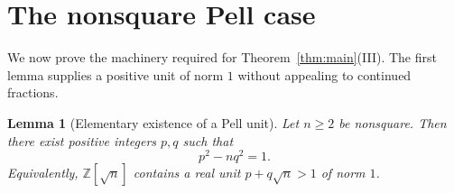 \documentclass[a4paper,11pt]{amsart}
\newtheorem{lemma}[lemma]{Lemma}
\theoremstyle{definition}
\theoremstyle{remark}
\newcommand{\Z}{\mathbb Z}
\begin{document}
\section{The nonsquare Pell case}

We now prove the machinery required for Theorem~\ref{thm:main}\textup{(III)}.  The first lemma supplies a positive unit of norm $1$ without appealing to continued fractions.

\begin{lemma}[Elementary existence of a Pell unit]\label{lem:pell-existence}
Let $n\ge2$ be nonsquare.  Then there exist positive integers $p,q$ such that
\begin{equation}\label{eq:pell-existence}
p^2-nq^2=1.
\end{equation}
Equivalently, $\Z[\sqrt n]$ contains a real unit $p+q\sqrt n>1$ of norm $1$.
\end{lemma}
\end{document}
